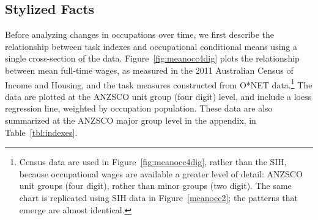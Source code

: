 \subsection{Stylized Facts}

Before analyzing changes in occupations over time, we first describe the relationship between task indexes and occupational conditional means using a single cross-section of the data. Figure~\ref{fig:meanocc4dig} plots the relationship between mean full-time wages, as measured in the 2011 Australian Census of Income and Housing, and the task measures constructed from O*NET data.\footnote{Census data are used in Figure~\ref{fig:meanocc4dig}, rather than the SIH, because occupational wages are available a greater level of detail: ANZSCO unit groups (four digit), rather than minor groups (two digit). The same chart is replicated using SIH data in Figure~\ref{meanocc2}; the patterns that emerge are almost identical.} The data are plotted at the ANZSCO unit group (four digit) level, and include a loess regression line, weighted by occupation population. These data are also summarized at the ANZSCO major group level in the appendix, in Table~\ref{tbl:indexes}.

